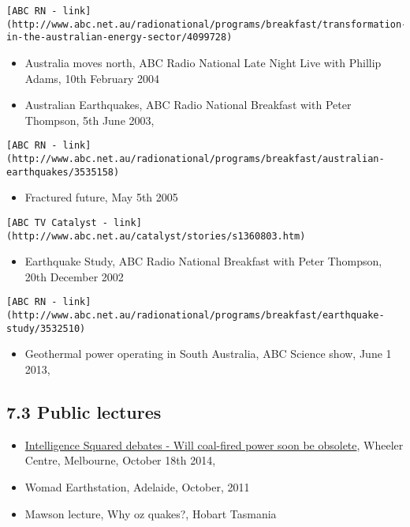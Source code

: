 \documentclass[
]{article}
\providecommand{\tightlist}{%
  \setlength{\itemsep}{0pt}\setlength{\parskip}{0pt}}
\begin{document}
\begin{verbatim}
[ABC RN - link](http://www.abc.net.au/radionational/programs/breakfast/transformation-in-the-australian-energy-sector/4099728)
\end{verbatim}

\begin{itemize}
\tightlist
\item
  Australia moves north, ABC Radio National Late Night Live with Phillip
  Adams, 10th February 2004
\item
  Australian Earthquakes, ABC Radio National Breakfast with Peter
  Thompson, 5th June 2003,
\end{itemize}

\begin{verbatim}
[ABC RN - link](http://www.abc.net.au/radionational/programs/breakfast/australian-earthquakes/3535158)
\end{verbatim}

\begin{itemize}
\tightlist
\item
  Fractured future, May 5th 2005
\end{itemize}

\begin{verbatim}
[ABC TV Catalyst - link](http://www.abc.net.au/catalyst/stories/s1360803.htm)
\end{verbatim}

\begin{itemize}
\tightlist
\item
  Earthquake Study, ABC Radio National Breakfast with Peter Thompson,
  20th December 2002
\end{itemize}

\begin{verbatim}
[ABC RN - link](http://www.abc.net.au/radionational/programs/breakfast/earthquake-study/3532510)
\end{verbatim}

\begin{itemize}
\tightlist
\item
  Geothermal power operating in South Australia, ABC Science show, June
  1 2013,
\end{itemize}

\hypertarget{public-lectures}{%
\subsection{7.3 Public lectures}\label{public-lectures}}

\begin{itemize}
\tightlist
\item
  \href{http://www.wheelercentre.com/events/coal-fired-power-will-soon-be-obsolete}{Intelligence
  Squared debates - Will coal-fired power soon be obsolete}, Wheeler
  Centre, Melbourne, October 18th 2014, 
\item
  Womad Earthstation, Adelaide, October, 2011
\item
  Mawson lecture, Why oz quakes?, Hobart Tasmania
\end{itemize}
\end{document}
